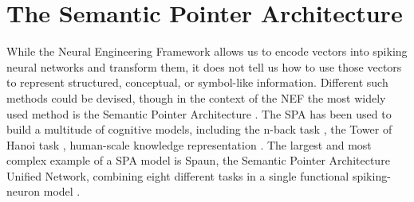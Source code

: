\chapter{The Semantic Pointer Architecture}\label{sec:spa}
While the Neural Engineering Framework allows us to encode vectors into spiking neural networks and transform them, it does not tell us how to use those vectors to represent structured, conceptual, or symbol-like information.
Different such methods could be devised, though in the context of the NEF the most widely used method is the Semantic Pointer Architecture \parencite[SPA;][]{eliasmith2013}.
The SPA has been used to build a multitude of cognitive models, including the n-back task \parencite{gosmann2015}, the Tower of Hanoi task \parencite{stewart2011-2}, human-scale knowledge representation \parencite{crawford2016}.
The largest and most complex example of a SPA model is Spaun, the Semantic Pointer Architecture Unified Network, combining eight different tasks in a single functional spiking-neuron model \parencite{Eliasmith2012}.

